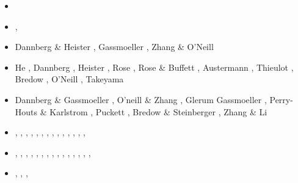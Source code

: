 \begin{itemize}
\begin{scriptsize}
\begin{itemize}
\item[\twothousandtwelve] \textcite{krhb12}
\item[\twothousandfifteen] \textcite{aupm15}, \textcite{tosn15}
\item[\twothousandsixteen] Dannberg \& Heister \cite{dahe16}, Gassmoeller \etal \cite{gadb16}, 
                           Zhang \& O'Neill \cite{zhon16}
\item[\twothousandseventeen] He \etal \cite{hepb17}, Dannberg \etal \cite{daef17}, 
                             Heister \etal \cite{hedg17}, Rose \etal \cite{robh17}, 
                             Rose \& Buffett \cite{robu17}, Austermann \etal \cite{aumh17},
                             Thieulot \cite{thie17}, Bredow \etal \cite{brsg17}, 
                             O'Neill \etal \cite{onmz17}, Takeyama \etal \cite{tasm17}
\item[\twothousandeighteen] Dannberg \& Gassmoeller \cite{daga18}, O'neill \& Zhang \cite{onzh18}, 
                            Glerum \etal \cite{gltf18}
                            Gassmoeller \etal \cite{galh18}, 
                            Perry-Houts \& Karlstrom \cite{peka18}, Puckett \etal \cite{puth18},
                            Bredow \& Steinberger \cite{brst18b}, Zhang \& Li \cite{zhli18}
\item[\twothousandnineteen]  \textcite{baba19},  \textcite{stbl19}, 
                             \textcite{cocf19},  \textcite{liki19}, 
                             \textcite{galb19},  \textcite{dagg19},
                             \textcite{njas19},  \textcite{sepg19}, 
                             \textcite{ropu19},  \textcite{frtv19},  \textcite{frbt19},
                             \textcite{lixs19},  \textcite{hepm19},  \textcite{heps19}, 
                             \textcite{perr19}
\item[\twothousandtwenty]    \textcite{gadb20},  \textcite{fahm20}, 
                             \textcite{logb20},  \textcite{hect20},  \textcite{hect20b}, 
                             \textcite{glbs20},  \textcite{lerm20}
                             \textcite{nagb20},  \textcite{cilw20},
                             \textcite{hemn20},  \textcite{onlw20}, 
                             \textcite{aslr20},  \textcite{mubi20},
                             \textcite{nemc20},  \textcite{ledb20},
                             \textcite{miac20},  \textcite{with20}
\item[\twothousandtwentyone]   \textcite{balm21}, \textcite{brst21}, \textcite{rasn21},

\end{itemize}
\end{scriptsize}
\end{itemize}
